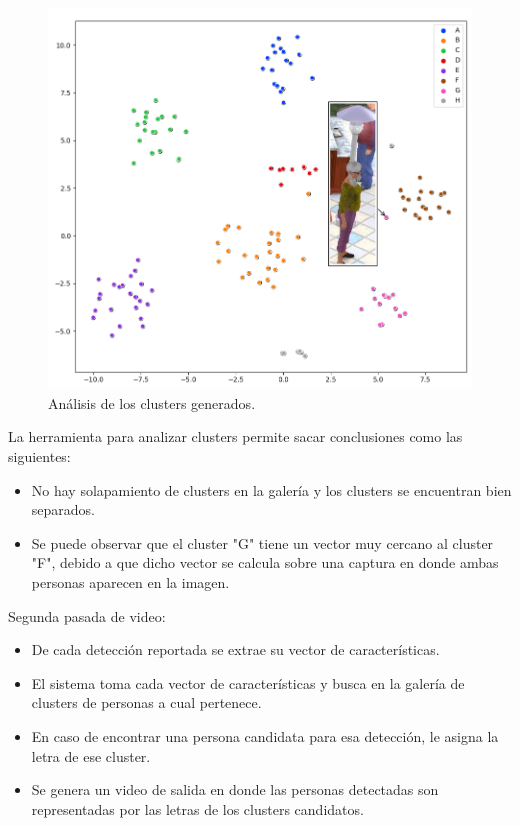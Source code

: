 \begin{figure}[ht]
	\centering
	\includegraphics[scale=.60]{./Figures/tsneClusers.png}
	\caption{Análisis de los clusters generados.}
	\label{fig:tsneClusers}
\end{figure}

La herramienta para analizar clusters permite sacar conclusiones como las siguientes:
\begin{itemize}
\item No hay solapamiento de clusters en la galería y los clusters se encuentran bien separados.
\item Se puede observar que el cluster "G" tiene un vector muy cercano al cluster "F", debido a que dicho vector se calcula sobre una captura en donde ambas personas aparecen en la imagen.
\end{itemize}

\newpage

Segunda pasada de video:
\begin{itemize}
\item De cada detección reportada se extrae su vector de características.
\item El sistema toma cada vector de características y busca en la galería de clusters de personas a cual pertenece.
\item En caso de encontrar una persona candidata para esa detección, le asigna la letra de ese cluster.
\item Se genera un video de salida en donde las personas detectadas son representadas por las letras de los clusters candidatos.
\end{itemize}

